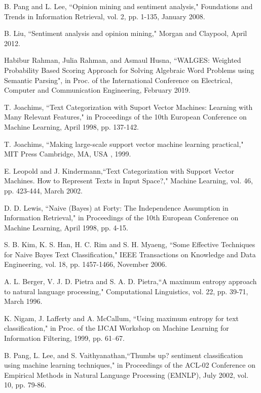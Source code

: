 \documentclass[10pt, conference]{IEEEtran}
\begin{document}
	\begin{thebibliography}{00}
		 B. Pang and L. Lee, ``Opinion mining and sentiment analysis," Foundations and Trends in Information Retrieval, vol. 2, pp. 1-135, January 2008.
		
		 B. Liu, ``Sentiment analysis and opinion mining," Morgan and Claypool, April 2012.
		
		 Habibur Rahman, Julia Rahman, and Asmaul Husna, ``WALGES: Weighted Probability Based Scoring Approach for Solving Algebraic Word Problems using Semantic Parsing", in Proc. of the International Conference on Electrical, Computer and Communication Engineering, February 2019.
		
		 T. Joachims, ``Text Categorization with Suport Vector Machines: Learning with Many Relevant Features," in Proceedings of the 10th European Conference on Machine Learning, April 1998,  pp. 137-142.
		
		 T. Joachims, ``Making large-scale support vector machine learning practical," MIT Press Cambridge, MA, USA , 1999.
		
		 E. Leopold and J. Kindermann,``Text Categorization with Support Vector Machines. How to Represent Texts in Input Space?," Machine Learning, vol. 46, pp. 423-444, March 2002.
		
		 D. D. Lewis, ``Naive (Bayes) at Forty: The Independence Assumption in Information Retrieval," in Proceedings of the 10th European Conference on Machine Learning, April 1998, pp. 4-15.
		
		 S. B. Kim, K. S. Han, H. C. Rim and S. H. Myaeng, ``Some Effective Techniques for Naive Bayes Text Classification," IEEE Transactions on Knowledge and Data Engineering, vol. 18, pp. 1457-1466, November  2006.
		
		 A. L. Berger, V. J. D. Pietra and S. A. D. Pietra,``A maximum entropy approach to natural language processing," Computational Linguistics, vol. 22, pp. 39-71, March 1996.
		
		 K. Nigam, J. Lafferty and A. McCallum, ``Using maximum entropy for text classification," in Proc. of the IJCAI Workshop on Machine Learning for Information Filtering, 1999, pp. 61–67.
		
		 B. Pang, L. Lee, and S. Vaithyanathan,``Thumbs up? sentiment classification using machine learning techniques," in Proceedings of the ACL-02 Conference on Empirical Methods in Natural Language Processing (EMNLP), July 2002, vol. 10, pp. 79-86.
		

\end{thebibliography}
\end{document}
